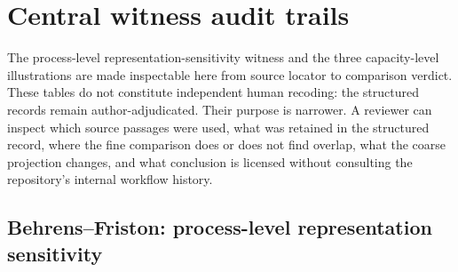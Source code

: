 \documentclass[11pt]{article}
\begin{document}
\section{Central witness audit trails}

The process-level representation-sensitivity witness and the three capacity-level illustrations are made inspectable here from source locator to comparison verdict. These tables do not constitute independent human recoding: the structured records remain author-adjudicated. Their purpose is narrower. A reviewer can inspect which source passages were used, what was retained in the structured record, where the fine comparison does or does not find overlap, what the coarse projection changes, and what conclusion is licensed without consulting the repository's internal workflow history.

\subsection{Behrens--Friston: process-level representation sensitivity}
\end{document}
